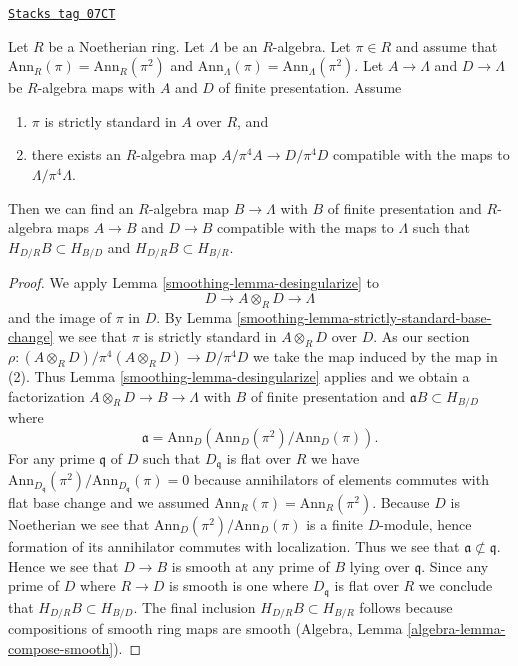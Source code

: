 \begin{lemma}
\label{smoothing-lemma-desingularize-strictly-standard}
\href{https://stacks.math.columbia.edu/tag/07CT}{\texttt{Stacks tag 07CT}}

Let $R$ be a Noetherian ring. Let $\Lambda$ be an $R$-algebra.
Let $\pi \in R$ and assume that $\text{Ann}_R(\pi) = \text{Ann}_R(\pi^2)$ and
$\text{Ann}_\Lambda(\pi) = \text{Ann}_\Lambda(\pi^2)$.
Let $A \to \Lambda$ and $D \to \Lambda$ be $R$-algebra maps with
$A$ and $D$ of finite presentation. Assume
\begin{enumerate}
\item $\pi$ is strictly standard in $A$ over $R$, and
\item there exists an $R$-algebra map $A/\pi^4 A \to D/\pi^4 D$ compatible
with the maps to $\Lambda/\pi^4 \Lambda$.
\end{enumerate}
Then we can find an $R$-algebra map $B \to \Lambda$ with $B$ of finite
presentation and $R$-algebra maps $A \to B$ and $D \to B$
compatible with the maps to $\Lambda$ such that $H_{D/R}B \subset H_{B/D}$
and $H_{D/R}B \subset H_{B/R}$.
\end{lemma}

\begin{proof}

We apply Lemma \ref{smoothing-lemma-desingularize} to
$$
D \longrightarrow A \otimes_R D \longrightarrow \Lambda
$$
and the image of $\pi$ in $D$. By
Lemma \ref{smoothing-lemma-strictly-standard-base-change}
we see that $\pi$ is strictly standard in $A \otimes_R D$ over $D$.
As our section $\rho : (A \otimes_R D)/\pi^4 (A \otimes_R D) \to D/\pi^4 D$
we take the map induced by the map in (2). Thus
Lemma \ref{smoothing-lemma-desingularize} applies and we obtain a factorization
$A \otimes_R D \to B \to \Lambda$ with $B$ of finite presentation
and $\mathfrak a B \subset H_{B/D}$ where
$$
\mathfrak a = \text{Ann}_D(\text{Ann}_D(\pi^2)/\text{Ann}_D(\pi)).
$$
For any prime $\mathfrak q$ of $D$ such that $D_\mathfrak q$ is flat over $R$
we have
$\text{Ann}_{D_\mathfrak q}(\pi^2)/\text{Ann}_{D_\mathfrak q}(\pi) = 0$
because annihilators of elements commutes with flat base change and
we assumed $\text{Ann}_R(\pi) = \text{Ann}_R(\pi^2)$. Because $D$ is
Noetherian we see that $\text{Ann}_D(\pi^2)/\text{Ann}_D(\pi)$ is a finite
$D$-module, hence formation of its annihilator commutes with localization.
Thus we see that $\mathfrak a \not \subset \mathfrak q$. Hence we see
that $D \to B$ is smooth at any prime of $B$ lying over $\mathfrak q$.
Since any prime of $D$ where $R \to D$ is smooth is one where
$D_\mathfrak q$ is flat over $R$ we conclude that $H_{D/R}B \subset H_{B/D}$.
The final inclusion $H_{D/R}B \subset H_{B/R}$ follows because compositions
of smooth ring maps are smooth
(Algebra, Lemma \ref{algebra-lemma-compose-smooth}).
\end{proof}

